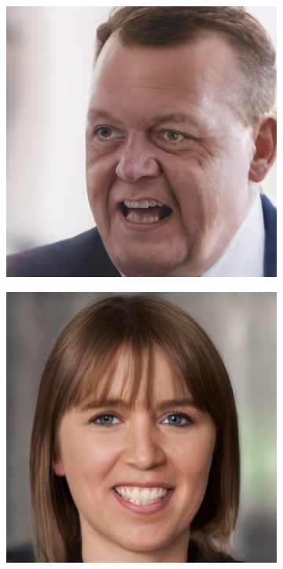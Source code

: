 \begin{figure}[h!]
\begin{subfigure}[b]{0.24\textwidth}
        \includegraphics[width=\textwidth]{fig/stylegan/faceedit/lars-smile}
    \end{subfigure}
    \begin{subfigure}[b]{0.24\textwidth}
        \includegraphics[width=\textwidth]{fig/stylegan/faceedit/mette-smile}

\end{subfigure}
\end{figure}
